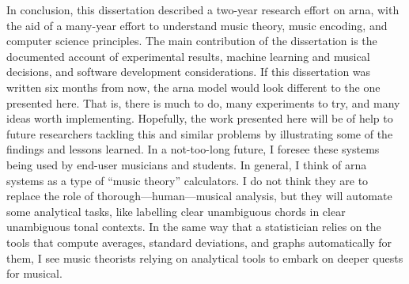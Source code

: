
In conclusion, this dissertation described a two-year
research effort on \gls{arna}, with the aid of a many-year
effort to understand music theory, music encoding, and
computer science principles. The main contribution of the
dissertation is the documented account of experimental
results, machine learning and musical decisions, and
software development considerations. If this dissertation
was written six months from now, the \gls{arna} model would
look different to the one presented here. That is, there is
much to do, many experiments to try, and many ideas worth
implementing. Hopefully, the work presented here will be of
help to future researchers tackling this and similar
problems by illustrating some of the findings and lessons
learned. In a not-too-long future, I foresee these systems
being used by end-user musicians and students. In general, I
think of \gls{arna} systems as a type of ``music theory''
calculators. I do not think they are to replace the role of
thorough---human---musical analysis, but they will automate
some analytical tasks, like labelling clear unambiguous
chords in clear unambiguous tonal contexts. In the same way
that a statistician relies on the tools that compute
averages, standard deviations, and graphs automatically for
them, I see music theorists relying on analytical tools to
embark on deeper quests for musical. 
